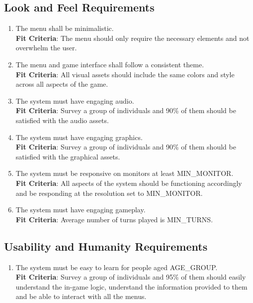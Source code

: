\documentclass{article}
\begin{document}
\subsection{Look and Feel Requirements}
\begin{enumerate}[{LF}1. ]
    \item The menu shall be minimalistic. \\
    \textbf{Fit Criteria}: The menu should only require the necessary elements and not overwhelm the user.
    \item The menu and game interface shall follow a consistent theme. \\
    \textbf{Fit Criteria}: All visual assets should include the same colors and style across all aspects of the game.  
    \item The system must have engaging audio. \\
    \textbf{Fit Criteria}: Survey a group of individuals and 90\% of them should be satisfied with the audio assets. 
    \item The system must have engaging graphics.\\
    \textbf{Fit Criteria}: Survey a group of individuals and 90\% of them should be satisfied with the graphical assets.
    \item The system must be responsive on monitors at least MIN\_MONITOR. \\
    \textbf{Fit Criteria}: All aspects of the system should be functioning accordingly and be responding at the resolution set to MIN\_MONITOR.
    \item The system must have engaging gameplay. \\
    \textbf{Fit Criteria}: Average number of turns played is MIN\_TURNS.
    
\end{enumerate}

\subsection{Usability and Humanity Requirements}
\begin{enumerate}[{UH}1. ]
    \item The system must be easy to learn for people aged AGE\_GROUP. \\
    \textbf{Fit Criteria}: Survey a group of individuals and 95\% of them should easily understand the in-game logic, understand the information provided to them and be able to interact with all the menus.
\end{enumerate}
\end{document}
